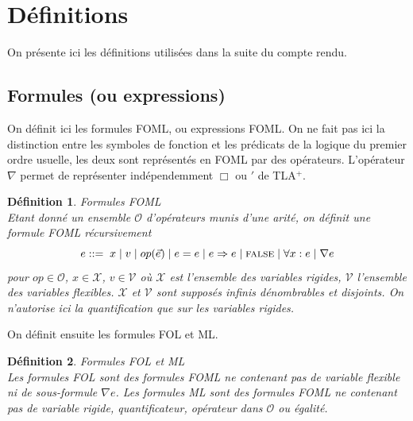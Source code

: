 \documentclass[12pt]{article}
\newcommand{\bpar}[1]{\marginpar{\color{myblue}\footnotesize\raggedright#1}}
\newcommand{\FALSE}{\textsc{false}}
\newtheorem{defin}{Définition}
\begin{document}
\section{Définitions}

On présente ici les définitions utilisées dans la suite du compte rendu.

\subsection{Formules (ou expressions)}


On définit ici les formules FOML, ou expressions FOML.
On ne fait pas ici la distinction entre les symboles de fonction et les prédicats de la logique du premier ordre usuelle, les deux sont représentés en FOML par des opérateurs.
L'opérateur $\nabla$ permet de représenter indépendemment $\Box$ ou $'$ de TLA$^+$.


\begin{defin} \emph{Formules FOML} \\
  Etant donné un ensemble $\mathcal{O}$ d'opérateurs munis d'une arité, on définit une formule FOML récursivement
  \[ e ::= \; x \; | \; v \; | \; op(\vec{e}) \; | \; e = e
    \; | \; e \Rightarrow e \; | \; \FALSE \; | \; \forall x : e \; | \; \nabla e \]
  pour $op \in \mathcal{O}$, $x \in \mathcal{X}$, $v \in \mathcal{V}$ où $\mathcal{X}$ est l'ensemble des variables \emph{rigides}, $\mathcal{V}$ l'ensemble des variables \emph{flexibles}. $\mathcal{X}$ et $\mathcal{V}$ sont supposés infinis dénombrables et disjoints.
  On n'autorise ici la quantification que sur les variables rigides.
\end{defin}


On définit ensuite les formules FOL et ML.

\begin{defin} \emph{Formules FOL et ML} \\
  Les formules FOL sont des formules FOML ne contenant pas de variable flexible ni de sous-formule $\nabla e$.
  Les formules ML sont des formules FOML ne contenant pas de variable rigide, quantificateur, opérateur dans $\mathcal{O}$ ou égalité.
\end{defin}
\end{document}
